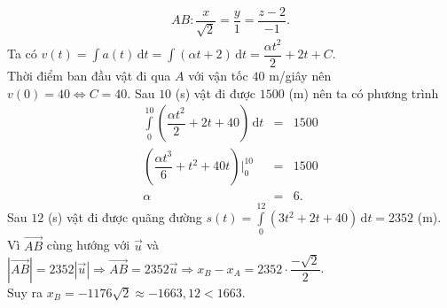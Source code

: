 \begin{ex}
{\begin{itemchoice}
\begin{align*}
				AB\colon \dfrac{x}{\sqrt{2}}=\dfrac{y}{1}=\dfrac{z-2}{-1}.
			\end{align*}
			\itemch 
			Ta có $v(t)=\displaystyle\int a(t) \mathrm{\,d}t=\displaystyle\int \left(\alpha t+2\right) \mathrm{\,d}t=\dfrac{\alpha t^2}{2}+2t+C$.\\
			Thời điểm ban đầu vật đi qua $A$ với vận tốc $40$ m/giây nên $v(0)=40\Leftrightarrow C=40$.
			Sau $10$ (s) vật đi được $1500$ (m) nên ta có phương trình
			\begin{eqnarray*}
				\displaystyle\int\limits_{0}^{10} \left(\dfrac{\alpha t^2}{2}+2t+40\right) \mathrm{\,d}t&=&1500\\
				\left(\dfrac{\alpha t^3}{6}+t^2+40t\right)\bigg|_0^{10}&=&1500\\
				\alpha&=&6.
			\end{eqnarray*}
			\itemch 
			Sau $12$ (s) vật đi được quãng đường $s(t)=\displaystyle\int\limits_{0}^{12} \left(3t^2+2t+40\right) \mathrm{\,d}t=2352$ (m).\\
			Vì $\overrightarrow{AB}$ cùng hướng với $\overrightarrow{u}$ và $\left|\overrightarrow{AB}\right|=2352\left|\overrightarrow{u}\right|\Rightarrow \overrightarrow{AB}=2352\overrightarrow{u}\Rightarrow x_B-x_A=2352\cdot \dfrac{-\sqrt{2}}{2}$.\\
			Suy ra $x_B=-1176\sqrt{2}\approx -1663{,}12<1663$.
		\end{itemchoice}
	}
\end{ex}
